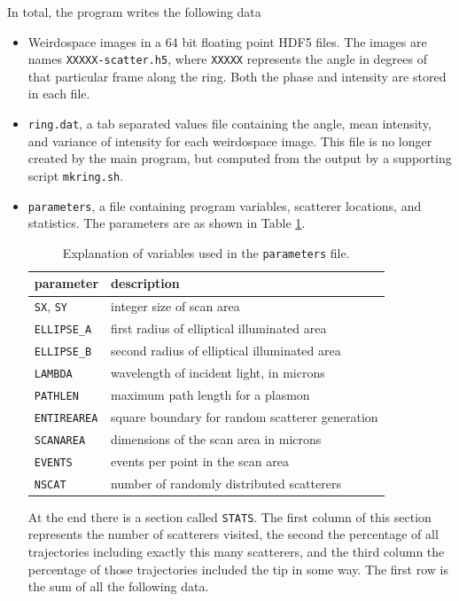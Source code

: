 In total, the program writes the following data
\begin{itemize}
	\item Weirdospace images in a 64 bit floating point HDF5 files.  The images
	      are names {\tt XXXXX-scatter.h5}, where {\tt XXXXX} represents the angle
	      in degrees of that particular frame along the ring.  Both the phase and
	      intensity are stored in each file.
	\item {\tt ring.dat}, a tab separated values file containing the angle,
	      mean intensity, and variance of intensity for each weirdospace image.  This
	      file is no longer created by the main program, but computed from the output
	      by a supporting script {\tt mkring.sh}.
	\item {\tt parameters}, a file containing program variables, scatterer
	      locations, and statistics.  The parameters are as shown in Table
	      \ref{tbl:parameters}.
	      \begin{table}
		      \label{tbl:parameters}
		      \begin{center}
			      \begin{tabular}{ll}
				      \toprule
				      parameter          & description                                     \\
				      \midrule
				      {\tt SX}, {\tt SY} & integer size of scan area                       \\
				      {\tt ELLIPSE\_A}   & first radius of elliptical illuminated area     \\
				      {\tt ELLIPSE\_B}   & second radius of elliptical illuminated area    \\
				      {\tt LAMBDA}       & wavelength of incident light, in microns        \\
				      {\tt PATHLEN}      & maximum path length for a plasmon               \\
				      {\tt ENTIREAREA}   & square boundary for random scatterer generation \\
				      {\tt SCANAREA}     & dimensions of the scan area in microns          \\
				      {\tt EVENTS}       & events per point in the scan area               \\
				      {\tt NSCAT}        & number of randomly distributed scatterers       \\
				      \bottomrule
			      \end{tabular}
		      \end{center}
		      \caption{Explanation of variables used in the {\tt parameters} file.}
	      \end{table}
	      At the end there is a section called {\tt STATS}.  The first column of this
	      section represents the number of scatterers visited, the second the
	      percentage of all trajectories including exactly this many scatterers, and
	      the third column the percentage of those trajectories included the tip in
	      some way.  The first row is the sum of all the following data.
\end{itemize}

